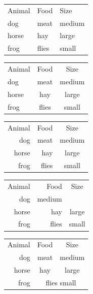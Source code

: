 \documentclass{article}
\begin{document}
\begin{tabular}{lll}
Animal & Food & Size \\
dog & meat & medium \\
horse & hay & large \\
frog & flies & small \\
\end{tabular}


\begin{tabular}{lcc}
Animal & Food & Size \\
dog & meat & medium \\
horse & hay & large \\
frog & flies & small \\
\end{tabular}

\begin{tabular}{rrc}
Animal & Food & Size \\
dog & meat & medium \\
horse & hay & large \\
frog & flies & small \\
\end{tabular}

\begin{tabular}{rrc}
Animal & Food & Size \\
dog &  medium \\
horse & hay & large \\
frog & flies & small \\
\end{tabular}

\begin{tabular}{rrc}
Animal & Food & Size \\
dog & meat & medium \\
horse &\multicolumn{1}{c}{hay} & large \\
frog & \multicolumn{2}{c}{flies small} \\
\end{tabular}
\end{document}
